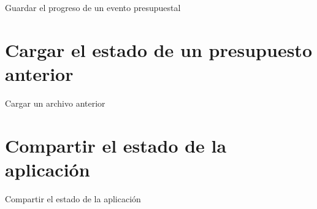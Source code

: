 \documentclass[
]{book}
\begin{document}
Guardar el progreso de un evento presupuestal

\hypertarget{cargar}{%
\chapter{Cargar el estado de un presupuesto anterior}\label{cargar}}

Cargar un archivo anterior

\hypertarget{compartir}{%
\chapter{Compartir el estado de la aplicación}\label{compartir}}

Compartir el estado de la aplicación

  
\end{document}
